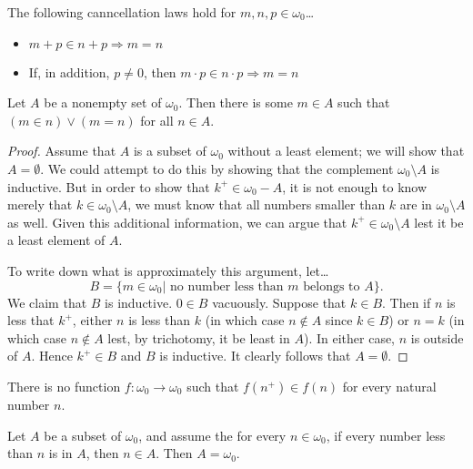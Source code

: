 \begin{corollary}
The following canncellation laws hold for $m,n,p \in \omega_0$\dots
\begin{itemize}
  \item $m + p \in n + p \Rightarrow m = n$
  \item If, in addition, $p \neq 0$, then $m \cdot p \in n \cdot p \Rightarrow m = n$
\end{itemize}
\end{corollary}

\begin{theorem}\label{wellorderingofnaturalnumbers}
Let $A$ be a nonempty set of $\omega_0.$ Then there is some $m \in A$ such that $(m \in n) \lor (m=n)$ for all $n \in A$.
\end{theorem}

\begin{proof}
Assume that $A$ is a subset of $\omega_0$ without a least element; we will 
show that $A = \emptyset$. We could attempt to do this by showing that the complement
$\omega_0 \setminus A$ is inductive. But in order to show that $k^+ \in \omega_0 - A$,
it is not enough to know merely that $k \in \omega_0 \setminus A$, we must know
that all numbers smaller than $k$ are in $\omega_0 \setminus A$ as well. Given this additional
information, we can argue that $k^+ \in \omega_0 \setminus A$ lest it be a least element of $A$.

To write down what is approximately this argument, let\dots
$$B = \{m \in \omega_0 | \textrm{ no number less than } m \textrm{ belongs to } A \}.$$
We claim that $B$ is inductive. $0 \in B$ vacuously. Suppose that $k \in B$. Then if 
$n$ is less that $k^+$, either $n$ is less than $k$ (in which case $n \not\in A$ since $k \in B$) or
$n = k$ (in which case $n \not\in A$ lest, by trichotomy, it be least in $A$). In either case, 
$n$ is outside of $A$. Hence $k^+ \in B$ and $B$ is inductive. It clearly follows that
$A = \emptyset$.
\end{proof}

\begin{corollary}
There is no function $f : \omega_0 \rightarrow \omega_0$ such that $f(n^+) \in f(n)$
for every natural number $n$.
\end{corollary}

\begin{theorem}
Let $A$ be a subset of $\omega_0$, and assume the for every $n \in \omega_0$, if
every number less than $n$ is in $A$, then $n \in A.$ Then $A = \omega_0$.
\end{theorem}

